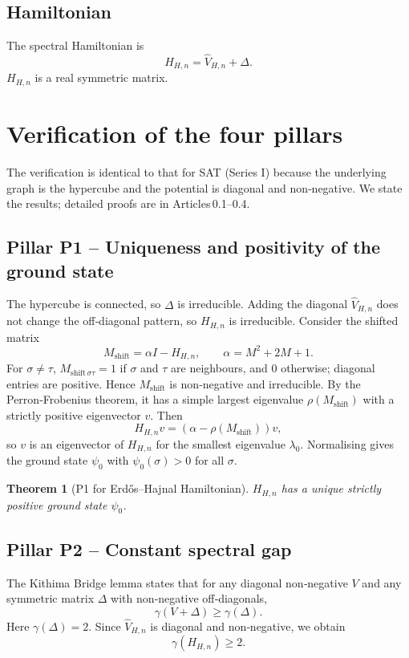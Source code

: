 \documentclass[11pt,a4paper]{article}
\newtheorem{theorem}{Theorem}[section]
\begin{document}
\subsection{Hamiltonian}
The spectral Hamiltonian is
\[
H_{H,n} = \hat{V}_{H,n} + \Delta.
\]
$H_{H,n}$ is a real symmetric matrix.

\section{Verification of the four pillars}
The verification is identical to that for SAT (Series I) because the underlying graph is the hypercube and the potential is diagonal and non‑negative. We state the results; detailed proofs are in Articles 0.1–0.4.

\subsection{Pillar P1 – Uniqueness and positivity of the ground state}
The hypercube is connected, so $\Delta$ is irreducible. Adding the diagonal $\hat{V}_{H,n}$ does not change the off‑diagonal pattern, so $H_{H,n}$ is irreducible. Consider the shifted matrix
\[
M_{\text{shift}} = \alpha I - H_{H,n},\qquad \alpha = M^2 + 2M + 1.
\]
For $\sigma\neq\tau$, $M_{\text{shift}\,\sigma\tau} = 1$ if $\sigma$ and $\tau$ are neighbours, and $0$ otherwise; diagonal entries are positive. Hence $M_{\text{shift}}$ is non‑negative and irreducible. By the Perron‑Frobenius theorem, it has a simple largest eigenvalue $\rho(M_{\text{shift}})$ with a strictly positive eigenvector $v$. Then
\[
H_{H,n} v = (\alpha - \rho(M_{\text{shift}})) v,
\]
so $v$ is an eigenvector of $H_{H,n}$ for the smallest eigenvalue $\lambda_0$. Normalising gives the ground state $\psi_0$ with $\psi_0(\sigma) > 0$ for all $\sigma$.

\begin{theorem}[P1 for Erdős–Hajnal Hamiltonian]
$H_{H,n}$ has a unique strictly positive ground state $\psi_0$.
\end{theorem}

\subsection{Pillar P2 – Constant spectral gap}
The Kithima Bridge lemma states that for any diagonal non‑negative $V$ and any symmetric matrix $\Delta$ with non‑negative off‑diagonals,
\[
\gamma(V + \Delta) \ge \gamma(\Delta).
\]
Here $\gamma(\Delta) = 2$. Since $\hat{V}_{H,n}$ is diagonal and non‑negative, we obtain
\[
\gamma(H_{H,n}) \ge 2.
\]
\end{document}
